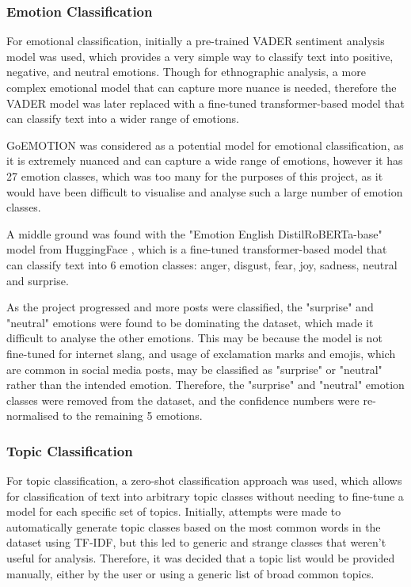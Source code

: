 \documentclass[12pt, a4paper]{article}
\begin{document}
\subsubsection{Emotion Classification}
\label{sec:emotion-classification}
For emotional classification, initially a pre-trained VADER sentiment analysis model was used, which provides a very simple way to classify text into positive, negative, and neutral emotions. Though for ethnographic analysis, a more complex emotional model that can capture more nuance is needed, therefore the VADER model was later replaced with a fine-tuned transformer-based model that can classify text into a wider range of emotions. 

GoEMOTION \cite{demszky2020goemotions} was considered as a potential model for emotional classification, as it is extremely nuanced and can capture a wide range of emotions, however it has 27 emotion classes, which was too many for the purposes of this project, as it would have been difficult to visualise and analyse such a large number of emotion classes. 

A middle ground was found with the "Emotion English DistilRoBERTa-base" model from HuggingFace \cite{hartmann2022emotionenglish}, which is a fine-tuned transformer-based model that can classify text into 6 emotion classes: anger, disgust, fear, joy, sadness, neutral and surprise.

As the project progressed and more posts were classified, the "surprise" and "neutral" emotions were found to be dominating the dataset, which made it difficult to analyse the other emotions. This may be because the model is not fine-tuned for internet slang, and usage of exclamation marks and emojis, which are common in social media posts, may be classified as "surprise" or "neutral" rather than the intended emotion. Therefore, the "surprise" and "neutral" emotion classes were removed from the dataset, and the confidence numbers were re-normalised to the remaining 5 emotions.

\subsubsection{Topic Classification}
For topic classification, a zero-shot classification approach was used, which allows for classification of text into arbitrary topic classes without needing to fine-tune a model for each specific set of topics. Initially, attempts were made to automatically generate topic classes based on the most common words in the dataset using TF-IDF, but this led to generic and strange classes that weren't useful for analysis. Therefore, it was decided that a topic list would be provided manually, either by the user or using a generic list of broad common topics. 
\end{document}
